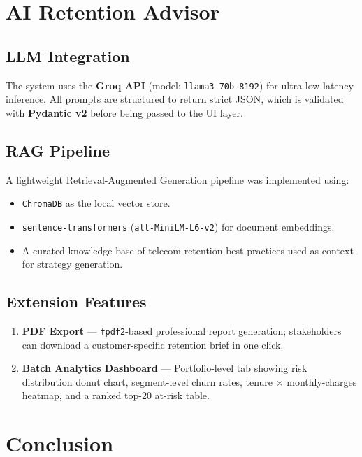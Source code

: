 \documentclass[12pt]{article}
\begin{document}
\section{AI Retention Advisor}

\subsection{LLM Integration}
The system uses the \textbf{Groq API} (model: \texttt{llama3-70b-8192}) for
ultra-low-latency inference. All prompts are structured to return strict
JSON, which is validated with \textbf{Pydantic v2} before being passed to
the UI layer.

\subsection{RAG Pipeline}
A lightweight Retrieval-Augmented Generation pipeline was implemented using:
\begin{itemize}
  \item \texttt{ChromaDB} as the local vector store.
  \item \texttt{sentence-transformers} (\texttt{all-MiniLM-L6-v2}) for
        document embeddings.
  \item A curated knowledge base of telecom retention best-practices used
        as context for strategy generation.
\end{itemize}

\subsection{Extension Features}
\begin{enumerate}
  \item \textbf{PDF Export} — \texttt{fpdf2}-based professional report
        generation; stakeholders can download a customer-specific retention
        brief in one click.
  \item \textbf{Batch Analytics Dashboard} — Portfolio-level tab showing
        risk distribution donut chart, segment-level churn rates, tenure
        $\times$ monthly-charges heatmap, and a ranked top-20 at-risk table.
\end{enumerate}

\section{Conclusion}
\end{document}
